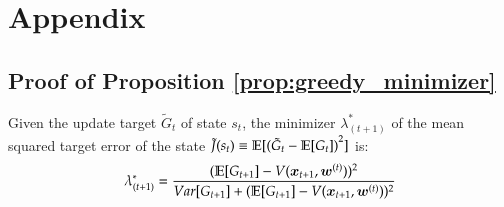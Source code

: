 \section*{Appendix}
\subsection{Proof of Proposition \ref{prop:greedy_minimizer}}
\begin{proposition*}
Given the update target $\tilde{G}_t$ of state $s_t$, the minimizer $\lambda_{(t+1)}^*$ of the mean squared target error of the state 
$\tilde{J}(s_t) \equiv \mathbb{E}[{(\tilde{G}_t - \mathbb{E}[G_t])}^2]$ is:
\begin{equation}
\lambda_{(t+1)}^* = \frac{(\mathbb{E}[G_{t+1}] - V(\bm{x}_{t+1}, \bm{w}^{(t)}))^2}{Var[G_{t+1}] + (\mathbb{E}[G_{t+1}] - V(\bm{x}_{t+1}, \bm{w}^{(t)}))^2}
\end{equation}
\end{proposition*}
